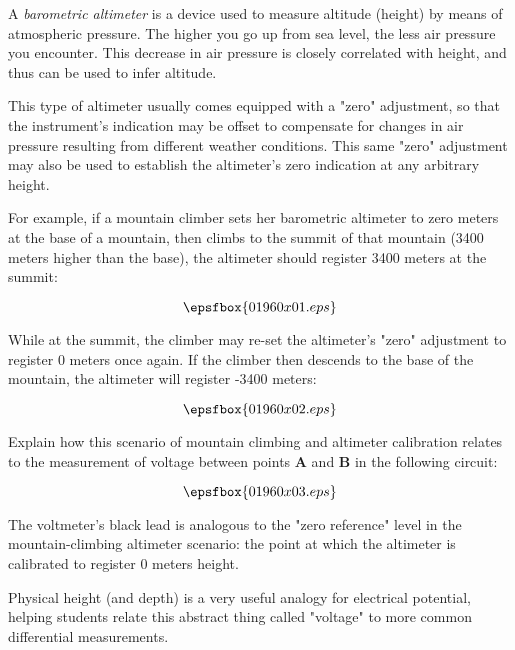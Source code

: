 

A {\it barometric altimeter} is a device used to measure altitude (height) by means of atmospheric pressure.  The higher you go up from sea level, the less air pressure you encounter.  This decrease in air pressure is closely correlated with height, and thus can be used to infer altitude.

This type of altimeter usually comes equipped with a "zero" adjustment, so that the instrument's indication may be offset to compensate for changes in air pressure resulting from different weather conditions.  This same "zero" adjustment may also be used to establish the altimeter's zero indication at any arbitrary height.

For example, if a mountain climber sets her barometric altimeter to zero meters at the base of a mountain, then climbs to the summit of that mountain (3400 meters higher than the base), the altimeter should register 3400 meters at the summit:

$$\epsfbox{01960x01.eps}$$

While at the summit, the climber may re-set the altimeter's "zero" adjustment to register 0 meters once again.  If the climber then descends to the base of the mountain, the altimeter will register -3400 meters:

$$\epsfbox{01960x02.eps}$$

Explain how this scenario of mountain climbing and altimeter calibration relates to the measurement of voltage between points {\bf A} and {\bf B} in the following circuit:

$$\epsfbox{01960x03.eps}$$







The voltmeter's black lead is analogous to the "zero reference" level in the mountain-climbing altimeter scenario: the point at which the altimeter is calibrated to register 0 meters height.







Physical height (and depth) is a very useful analogy for electrical potential, helping students relate this abstract thing called "voltage" to more common differential measurements.




